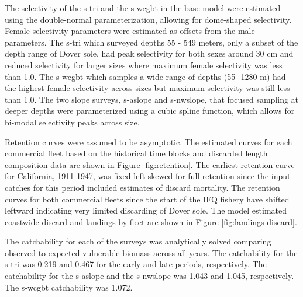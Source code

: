 \documentclass[11pt,
  english,
  a4paper,
]{article}
\begin{document}
\leavevmode\tagmcend\tagstructend\par


The selectivity of the \gls{s-tri} and the \gls{s-wcgbt} in the base model were estimated using the double-normal parameterization, allowing for dome-shaped selectivity. Female selectivity parameters were estimated as offsets from the male parameters. The \gls{s-tri} which surveyed depths 55 - 549 meters, only a subset of the depth range of Dover sole, had peak selectivity for both sexes around 30 cm and reduced selectivity for larger sizes where maximum female selectivity was less than 1.0. The \gls{s-wcgbt} which samples a wide range of depths (55 -1280 m) had the highest female selectivity across sizes but maximum selectivity was still less than 1.0. The two slope surveys, \gls{s-aslope} and \gls{s-nwslope}, that focused sampling at deeper depths were parameterized using a cubic spline function, which allows for bi-modal selectivity peaks across size.

\leavevmode\tagmcend\tagstructend\par


Retention curves were assumed to be asymptotic. The estimated curves for each commercial fleet based on the historical time blocks and discarded length composition data are shown in Figure \ref{fig:retention}. The earliest retention curve for California, 1911-1947, was fixed left skewed for full retention since the input catches for this period included estimates of discard mortality. The retention curves for both commercial fleets since the start of the IFQ fishery have shifted leftward indicating very limited discarding of Dover sole. The model estimated coastwide discard and landings by fleet are shown in Figure \ref{fig:landings-discard}.

\leavevmode\tagmcend\tagstructend\par


The catchability for each of the surveys was analytically solved comparing observed to expected vulnerable biomass across all years. The catchability for the \gls{s-tri} was 0.219 and 0.467 for the early and late periods, respectively. The catchability for the \gls{s-aslope} and the \gls{s-nwslope} was 1.043 and 1.045, respectively. The \gls{s-wcgbt} catchability was 1.072.
\end{document}
